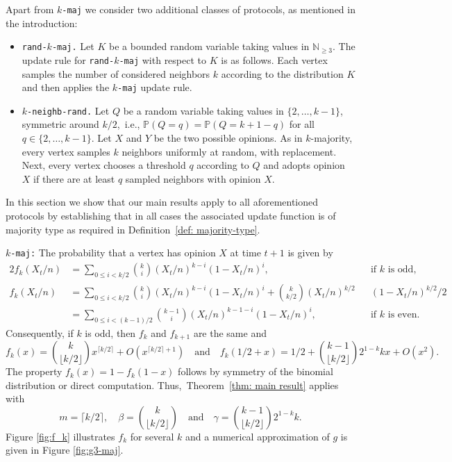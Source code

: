 \documentclass[11pt]{article}
\newcommand{\Prob}{\mathbb{P}}
\numberwithin{theorem}{section}
\begin{document}
Apart from \texttt{$k$-maj} we consider two additional classes of protocols, as mentioned in the introduction:
\begin{itemize}
\itemsep0pt
    \item \texttt{rand-$k$-maj.} Let $K$ be a bounded random variable taking values in $\mathbb{N}_{\geq 3}$. The update rule for \texttt{rand-\allowbreak $k$-\allowbreak maj} with respect to $K$ is as follows. Each vertex samples the number of considered neighbors $k$ according to the distribution $K$ and then applies the \texttt{$k$-maj} update rule.
    \item \texttt{$k$-neighb-rand.} Let $Q$ be a random variable taking values in $\{2,\dots,k-1\}$, symmetric around $k/2$,~i.e., $\Prob(Q=q)=\Prob(Q=k+1-q)$ for all $q\in\{2,\dots,k-1\}$. Let $X$ and $Y$ be the two possible opinions.
    As in $k$-majority, every vertex samples $k$ neighbors uniformly at random, with replacement. Next, every vertex chooses a threshold $q$ according to $Q$ and adopts opinion $X$ if there are at least $q$ sampled neighbors with opinion $X$.
\end{itemize}
In this section we show that our main results apply to all aforementioned protocols by establishing that in all cases the associated update function is of majority type as required in Definition~\ref{def: majority-type}.

\medskip
\noindent
\texttt{$k$-maj:} The probability that a vertex has opinion $X$ at time $t+1$ is given by
\begin{alignat*}{2}
    f_k(X_t/n)&= \sum_{0\leq i <  k/2 }\binom{k}{i} (X_t/n)^{k-i} (1-X_t/n)^{i}, \quad 
    &&\text{if }k \text{ is odd}, \\
    f_k(X_t/n)&=\sum_{0\leq i <  k/2 }\binom{k}{i} (X_t/n)^{k-i} (1-X_t/n)^{i} +\binom{k}{k/2}(X_t/n)^{k/2} &&(1-X_t/n)^{k/2}/2 \\
    &=\sum_{0\leq i <  (k-1)/2 }\binom{k-1}{i} (X_t/n)^{k-1-i} (1-X_t/n)^{i}, \quad 
    &&\text{if }k \text{ is even}.
\end{alignat*}
Consequently, if $k$ is odd, then $f_k$ and $f_{k+1}$ are the same and 
\[
f_k(x) = \binom{k}{\lfloor k/2 \rfloor} x^{\lceil k/2 \rceil} +O(x^{\lceil k/2 \rceil+1}) 
\quad
\text{and} 
\quad
f_k(1/2 +x) =1/2 +\binom{k-1}{\lfloor k/2\rfloor} 2^{1-k}k x + O(x^2).
\]
The property $f_k(x)=1-f_k(1-x)$ follows by symmetry of the binomial distribution or direct computation.
Thus,~Theorem~\ref{thm: main result} applies with
\[
m = \lceil k/2\rceil, \quad \beta =\binom{k}{\lfloor k/2 \rfloor} \quad \text{and} \quad \gamma = \binom{k-1}{\lfloor k/2\rfloor} 2^{1-k}k.
\]
Figure \ref{fig:f_k} illustrates $f_k$ for several $k$ and a numerical approximation of $g$ is given in Figure \ref{fig:g3-maj}. 
\end{document}
